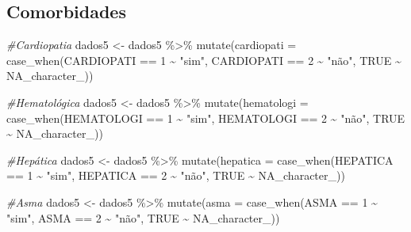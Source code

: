 \documentclass[
]{article}
\newenvironment{Shaded}{\begin{snugshade}}{\end{snugshade}}
\newcommand{\AttributeTok}[1]{\textcolor[rgb]{0.77,0.63,0.00}{#1}}
\newcommand{\CommentTok}[1]{\textcolor[rgb]{0.56,0.35,0.01}{\textit{#1}}}
\newcommand{\ConstantTok}[1]{\textcolor[rgb]{0.00,0.00,0.00}{#1}}
\newcommand{\DecValTok}[1]{\textcolor[rgb]{0.00,0.00,0.81}{#1}}
\newcommand{\FunctionTok}[1]{\textcolor[rgb]{0.00,0.00,0.00}{#1}}
\newcommand{\NormalTok}[1]{#1}
\newcommand{\OtherTok}[1]{\textcolor[rgb]{0.56,0.35,0.01}{#1}}
\newcommand{\SpecialCharTok}[1]{\textcolor[rgb]{0.00,0.00,0.00}{#1}}
\newcommand{\StringTok}[1]{\textcolor[rgb]{0.31,0.60,0.02}{#1}}
\begin{document}
\hypertarget{comorbidades}{%
\subsection{Comorbidades}\label{comorbidades}}

\begin{Shaded}
\begin{Highlighting}[]
\CommentTok{\#Cardiopatia}
\NormalTok{dados5 }\OtherTok{\textless{}{-}}\NormalTok{  dados5 }\SpecialCharTok{\%\textgreater{}\%}
  \FunctionTok{mutate}\NormalTok{(}\AttributeTok{cardiopati =} \FunctionTok{case\_when}\NormalTok{(CARDIOPATI }\SpecialCharTok{==} \DecValTok{1} \SpecialCharTok{\textasciitilde{}} \StringTok{"sim"}\NormalTok{,}
\NormalTok{                                CARDIOPATI }\SpecialCharTok{==} \DecValTok{2} \SpecialCharTok{\textasciitilde{}} \StringTok{"não"}\NormalTok{,}
                                \ConstantTok{TRUE} \SpecialCharTok{\textasciitilde{}} \ConstantTok{NA\_character\_}\NormalTok{))}

\CommentTok{\#Hematológica}
\NormalTok{dados5 }\OtherTok{\textless{}{-}}\NormalTok{  dados5 }\SpecialCharTok{\%\textgreater{}\%}
  \FunctionTok{mutate}\NormalTok{(}\AttributeTok{hematologi =} \FunctionTok{case\_when}\NormalTok{(HEMATOLOGI }\SpecialCharTok{==} \DecValTok{1} \SpecialCharTok{\textasciitilde{}} \StringTok{"sim"}\NormalTok{,}
\NormalTok{                                HEMATOLOGI }\SpecialCharTok{==} \DecValTok{2} \SpecialCharTok{\textasciitilde{}} \StringTok{"não"}\NormalTok{,}
                                \ConstantTok{TRUE} \SpecialCharTok{\textasciitilde{}} \ConstantTok{NA\_character\_}\NormalTok{))}

\CommentTok{\#Hepática}
\NormalTok{dados5 }\OtherTok{\textless{}{-}}\NormalTok{  dados5 }\SpecialCharTok{\%\textgreater{}\%}
  \FunctionTok{mutate}\NormalTok{(}\AttributeTok{hepatica =} \FunctionTok{case\_when}\NormalTok{(HEPATICA }\SpecialCharTok{==} \DecValTok{1} \SpecialCharTok{\textasciitilde{}} \StringTok{"sim"}\NormalTok{,}
\NormalTok{                              HEPATICA }\SpecialCharTok{==} \DecValTok{2} \SpecialCharTok{\textasciitilde{}} \StringTok{"não"}\NormalTok{,}
                              \ConstantTok{TRUE} \SpecialCharTok{\textasciitilde{}} \ConstantTok{NA\_character\_}\NormalTok{))}

\CommentTok{\#Asma}
\NormalTok{dados5 }\OtherTok{\textless{}{-}}\NormalTok{  dados5 }\SpecialCharTok{\%\textgreater{}\%}
  \FunctionTok{mutate}\NormalTok{(}\AttributeTok{asma =} \FunctionTok{case\_when}\NormalTok{(ASMA }\SpecialCharTok{==} \DecValTok{1} \SpecialCharTok{\textasciitilde{}} \StringTok{"sim"}\NormalTok{,}
\NormalTok{                          ASMA }\SpecialCharTok{==} \DecValTok{2} \SpecialCharTok{\textasciitilde{}} \StringTok{"não"}\NormalTok{,}
                          \ConstantTok{TRUE} \SpecialCharTok{\textasciitilde{}} \ConstantTok{NA\_character\_}\NormalTok{))}


\end{Highlighting}
\end{Shaded}
\end{document}
